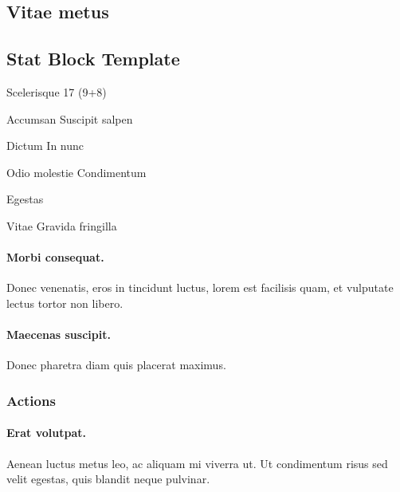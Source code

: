 \subsection*{Vitae metus} \lipsum[124-125]

\begin{hbStatBlock}
\subsection*{Stat Block Template}
\hbSBSep
\begin{hbStatBlockDescription}
\item[Scelerisque] 17 (9+8)
\item[Accumsan] Suscipit salpen
\item[Dictum] In nunc
\end{hbStatBlockDescription}
\hbSBSep
{}
\hbSBSep
\begin{hbStatBlockDescription}
\item[Odio molestie] Condimentum
\item[Egestas] \hbNone
\item[Vitae] Gravida fringilla
\end{hbStatBlockDescription}
\hbSBSep

\paragraph*{Morbi consequat.} Donec venenatis, eros in tincidunt luctus, lorem est facilisis quam, et vulputate lectus tortor non libero.

\paragraph*{Maecenas suscipit.} Donec pharetra diam quis placerat maximus.

\subsubsection*{Actions}

\paragraph*{Erat volutpat.} Aenean luctus metus leo, ac aliquam mi viverra ut. Ut condimentum risus sed velit egestas, quis blandit neque pulvinar.

\end{hbStatBlock}

